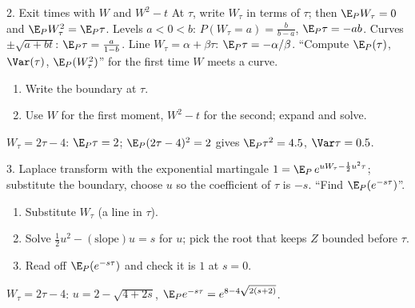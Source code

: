 \begin{card}{2. Exit times with \texorpdfstring{$W$}{W} and \texorpdfstring{$W^2-t$}{W squared minus t}}
\Formula
At $\tau$, write $W_\tau$ in terms of $\tau$; then $\E_PW_\tau=0$ and $\E_PW_\tau^2=\E_P\tau$. Levels $a<0<b$: $P(W_\tau=a)=\frac{b}{b-a}$, $\E_P\tau=-ab$. Curves $\pm\sqrt{a+bt}$: $\E_P\tau=\frac a{1-b}$. Line $W_\tau=\alpha+\beta\tau$: $\E_P\tau=-\alpha/\beta$.
\UseWhen
``Compute $\E_P(\tau)$, $\Var(\tau)$, $\E_P(W_\tau^2)$'' for the first time $W$ meets a curve.
\HowTo
\begin{enumerate}
  \item Write the boundary at $\tau$.
  \item Use $W$ for the first moment, $W^2-t$ for the second; expand and solve.
\end{enumerate}
\Caveats
{}
\begin{cardex}
$W_\tau=2\tau-4$: $\E_P\tau=2$; $\E_P(2\tau-4)^2=2$ gives $\E_P\tau^2=4.5$, $\Var\tau=0.5$.
\end{cardex}
\end{card}

\begin{card}{3. Laplace transform with the exponential martingale}
\Formula
$1=\E_P\,e^{uW_\tau-\frac12u^2\tau}$; substitute the boundary, choose $u$ so the coefficient of $\tau$ is $-s$.
\UseWhen
``Find $\E_P(e^{-s\tau})$''.
\HowTo
\begin{enumerate}
  \item Substitute $W_\tau$ (a line in $\tau$).
  \item Solve $\frac12u^2-(\text{slope})u=s$ for $u$; pick the root that keeps $Z$ bounded before $\tau$.
  \item Read off $\E_P(e^{-s\tau})$ and check it is $1$ at $s=0$.
\end{enumerate}
\Caveats
{}
\begin{cardex}
$W_\tau=2\tau-4$: $u=2-\sqrt{4+2s}$, $\E_Pe^{-s\tau}=e^{8-4\sqrt{2(s+2)}}$.
\end{cardex}
\end{card}
